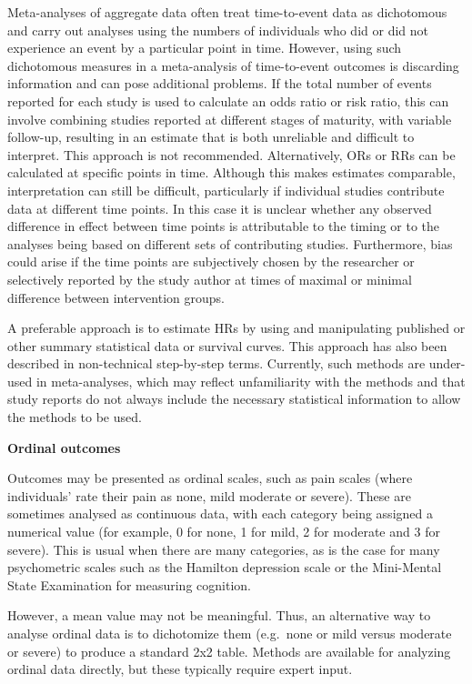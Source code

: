 \documentclass[
  11pt,
  a4paper,
  DIV=11,
  numbers=noendperiod]{scrreprt}
\begin{document}
Meta-analyses of aggregate data often treat time-to-event data as
dichotomous and carry out analyses using the numbers of individuals who
did or did not experience an event by a particular point in time.
However, using such dichotomous measures in a meta-analysis of
time-to-event outcomes is discarding information and can pose additional
problems. If the total number of events reported for each study is used
to calculate an odds ratio or risk ratio, this can involve combining
studies reported at different stages of maturity, with variable
follow-up, resulting in an estimate that is both unreliable and
difficult to interpret. This approach is not recommended. Alternatively,
ORs or RRs can be calculated at specific points in time. Although this
makes estimates comparable, interpretation can still be difficult,
particularly if individual studies contribute data at different time
points. In this case it is unclear whether any observed difference in
effect between time points is attributable to the timing or to the
analyses being based on different sets of contributing studies.
Furthermore, bias could arise if the time points are subjectively chosen
by the researcher or selectively reported by the study author at times
of maximal or minimal difference between intervention groups.

A preferable approach is to estimate HRs by using and manipulating
published or other summary statistical data or survival curves. This
approach has also been described in non-technical step-by-step terms.
Currently, such methods are under-used in meta-analyses, which may
reflect unfamiliarity with the methods and that study reports do not
always include the necessary statistical information to allow the
methods to be used.

\textbf{Ordinal outcomes}

Outcomes may be presented as ordinal scales, such as pain scales (where
individuals' rate their pain as none, mild moderate or severe). These
are sometimes analysed as continuous data, with each category being
assigned a numerical value (for example, 0 for none, 1 for mild, 2 for
moderate and 3 for severe). This is usual when there are many
categories, as is the case for many psychometric scales such as the
Hamilton depression scale or the Mini-Mental State Examination for
measuring cognition.

However, a mean value may not be meaningful. Thus, an alternative way to
analyse ordinal data is to dichotomize them (e.g.~none or mild versus
moderate or severe) to produce a standard 2x2 table. Methods are
available for analyzing ordinal data directly, but these typically
require expert input.
\end{document}

